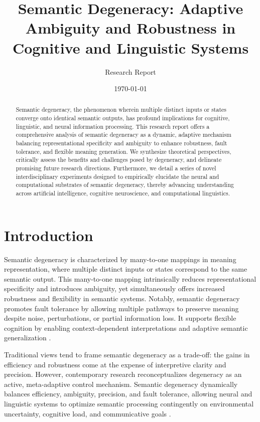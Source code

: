 \documentclass[12pt,a4paper]{article}
\title{Semantic Degeneracy: Adaptive Ambiguity and Robustness in Cognitive and Linguistic Systems}
\author{Research Report}
\date{\today}
\begin{document}
\maketitle

\begin{abstract}
Semantic degeneracy, the phenomenon wherein multiple distinct inputs or states converge onto identical semantic outputs, has profound implications for cognitive, linguistic, and neural information processing. This research report offers a comprehensive analysis of semantic degeneracy as a dynamic, adaptive mechanism balancing representational specificity and ambiguity to enhance robustness, fault tolerance, and flexible meaning generation. We synthesize theoretical perspectives, critically assess the benefits and challenges posed by degeneracy, and delineate promising future research directions. Furthermore, we detail a series of novel interdisciplinary experiments designed to empirically elucidate the neural and computational substrates of semantic degeneracy, thereby advancing understanding across artificial intelligence, cognitive neuroscience, and computational linguistics.
\end{abstract}

\section{Introduction}

Semantic degeneracy is characterized by many-to-one mappings in meaning representation, where multiple distinct inputs or states correspond to the same semantic output. This many-to-one mapping intrinsically reduces representational specificity and introduces ambiguity, yet simultaneously offers increased robustness and flexibility in semantic systems. Notably, semantic degeneracy promotes fault tolerance by allowing multiple pathways to preserve meaning despite noise, perturbations, or partial information loss. It supports flexible cognition by enabling context-dependent interpretations and adaptive semantic generalization \cite{citation_needed}.

Traditional views tend to frame semantic degeneracy as a trade-off: the gains in efficiency and robustness come at the expense of interpretive clarity and precision. However, contemporary research reconceptualizes degeneracy as an active, meta-adaptive control mechanism. Semantic degeneracy dynamically balances efficiency, ambiguity, precision, and fault tolerance, allowing neural and linguistic systems to optimize semantic processing contingently on environmental uncertainty, cognitive load, and communicative goals \cite{citation_needed}.
\end{document}
